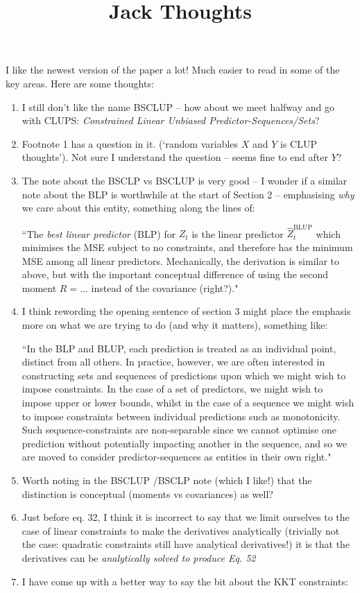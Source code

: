 \documentclass[]{article}
\title{Jack Thoughts}
\begin{document}
	\maketitle

	I like the newest version of the paper a lot! Much easier to read in some of the key areas. Here are some thoughts:

	
	\begin{enumerate}
		\item I still don't like the name BSCLUP -- how about we meet halfway and go with CLUPS: \textit{Constrained Linear Unbiased Predictor-Sequences/Sets}? 
		\item Footnote 1 has a question in it. (`random variables $X$ and $Y$ is CLUP thoughts'). Not sure I understand the question -- seems fine to end after $Y$?
		\item The note about the BSCLP vs BSCLUP is very good -- I wonder if a similar note about the BLP is worthwhile at the start of Section 2 -- emphasising \textit{why} we care about this entity, something along the lines of:
		
		``The \textit{best linear predictor} (BLP) for $Z_t$ is the linear predictor $\hat{Z}_t^\text{BLUP}$ which minimises the MSE subject to no constraints, and therefore has the minimum MSE among all linear predictors. Mechanically, the derivation is similar to above, but with the important conceptual difference of using the second moment $R = ...$ instead of the covariance (right?)."
		\item I think rewording the opening sentence of section 3 might place the emphasis more on what we are trying to do (and why it matters), something like:
		
		``In the BLP and BLUP, each prediction is treated as an individual point, distinct from all others. In practice, however, we are often interested in constructing sets and sequences of predictions upon which we might wish to impose constraints. In the case of a set of predictors, we might wish to impose upper or lower bounds, whilst in the case of a sequence we might wish to impose constraints between individual predictions such as monotonicity. Such sequence-constraints are non-separable since we cannot optimise one prediction without potentially impacting another in the sequence, and so we are moved to consider predictor-sequences as entities in their own right."
		\item Worth noting in the BSCLUP /BSCLP note (which I like!) that the distinction is conceptual (moments vs covariances) as well?
		\item Just before eq. 32, I think it is incorrect to say that we limit ourselves to the case of linear constraints to make the derivatives analytically (trivially not the case: quadratic constraints still have analytical derivatives!) it is that the derivatives can be \textit{analytically solved to produce Eq. 52} 
		\item I have come up with a better way to say the bit about the KKT constraints:
		

\end{enumerate}
\end{document}
